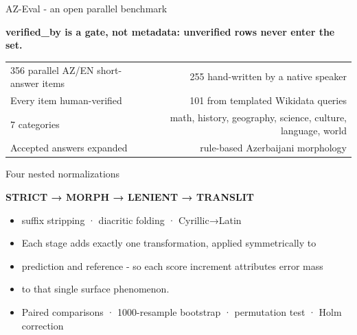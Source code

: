 \documentclass[aspectratio=169,12pt]{beamer}
\begin{document}
\begin{frame}{AZ-Eval - an open parallel benchmark}
\begin{center}{\large\bfseries verified\_by is a gate, not metadata: unverified rows never enter the set.}\end{center}
\vspace{0.3cm}
\begin{center}
\begin{tabular}{lr}
\toprule
356 parallel AZ/EN short-answer items & 255 hand-written by a native speaker \\
Every item human-verified & 101 from templated Wikidata queries \\
7 categories & math, history, geography, science, culture, language, world \\
Accepted answers expanded & rule-based Azerbaijani morphology \\
\bottomrule
\end{tabular}
\end{center}
\vspace{0.3cm}
\end{frame}

\begin{frame}{Four nested normalizations}
\begin{center}{\large\bfseries STRICT  →  MORPH  →  LENIENT  →  TRANSLIT}\end{center}
\vspace{0.3cm}
\begin{itemize}
\vspace{0.25cm}
  \item[] suffix stripping   ·   diacritic folding   ·   Cyrillic→Latin
\vspace{0.25cm}
  \item[] Each stage adds exactly one transformation, applied symmetrically to
  \item[] prediction and reference - so each score increment attributes error mass
  \item[] to that single surface phenomenon.
\vspace{0.25cm}
  \item[] Paired comparisons · 1000-resample bootstrap · permutation test · Holm correction
\end{itemize}
\end{frame}
\end{document}
